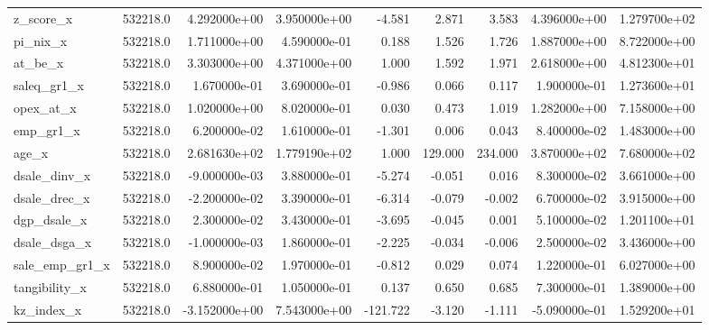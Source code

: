 \documentclass[12pt]{article}
\begin{document}
\begin{landscape}
\begin{longtable}{|l|r|r|r|r|r|r|r|r|}
z\_score\_x              &  532218.0 &  4.292000e+00 &  3.950000e+00 &      -4.581 &        2.871 &        3.583 &  4.396000e+00 &  1.279700e+02 \\
pi\_nix\_x               &  532218.0 &  1.711000e+00 &  4.590000e-01 &       0.188 &        1.526 &        1.726 &  1.887000e+00 &  8.722000e+00 \\
at\_be\_x                &  532218.0 &  3.303000e+00 &  4.371000e+00 &       1.000 &        1.592 &        1.971 &  2.618000e+00 &  4.812300e+01 \\
saleq\_gr1\_x            &  532218.0 &  1.670000e-01 &  3.690000e-01 &      -0.986 &        0.066 &        0.117 &  1.900000e-01 &  1.273600e+01 \\
opex\_at\_x              &  532218.0 &  1.020000e+00 &  8.020000e-01 &       0.030 &        0.473 &        1.019 &  1.282000e+00 &  7.158000e+00 \\
emp\_gr1\_x              &  532218.0 &  6.200000e-02 &  1.610000e-01 &      -1.301 &        0.006 &        0.043 &  8.400000e-02 &  1.483000e+00 \\
age\_x                  &  532218.0 &  2.681630e+02 &  1.779190e+02 &       1.000 &      129.000 &      234.000 &  3.870000e+02 &  7.680000e+02 \\
dsale\_dinv\_x           &  532218.0 & -9.000000e-03 &  3.880000e-01 &      -5.274 &       -0.051 &        0.016 &  8.300000e-02 &  3.661000e+00 \\
dsale\_drec\_x           &  532218.0 & -2.200000e-02 &  3.390000e-01 &      -6.314 &       -0.079 &       -0.002 &  6.700000e-02 &  3.915000e+00 \\
dgp\_dsale\_x            &  532218.0 &  2.300000e-02 &  3.430000e-01 &      -3.695 &       -0.045 &        0.001 &  5.100000e-02 &  1.201100e+01 \\
dsale\_dsga\_x           &  532218.0 & -1.000000e-03 &  1.860000e-01 &      -2.225 &       -0.034 &       -0.006 &  2.500000e-02 &  3.436000e+00 \\
sale\_emp\_gr1\_x         &  532218.0 &  8.900000e-02 &  1.970000e-01 &      -0.812 &        0.029 &        0.074 &  1.220000e-01 &  6.027000e+00 \\
tangibility\_x          &  532218.0 &  6.880000e-01 &  1.050000e-01 &       0.137 &        0.650 &        0.685 &  7.300000e-01 &  1.389000e+00 \\
kz\_index\_x             &  532218.0 & -3.152000e+00 &  7.543000e+00 &    -121.722 &       -3.120 &       -1.111 & -5.090000e-01 &  1.529200e+01 \\

\end{longtable}
\end{landscape}
\end{document}

